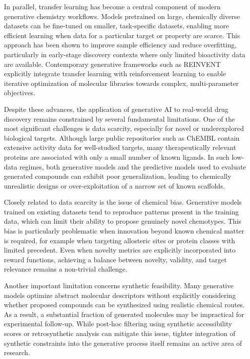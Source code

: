 \documentclass[letterpaper]{article}
\begin{document}
In parallel, transfer learning has become a central component of modern generative chemistry workflows\cite{Segler2017GeneratingNetworks,Gomez-Bombarelli2018AutomaticMolecules}. Models pretrained on large, chemically diverse datasets can be fine-tuned on smaller, task-specific datasets, enabling more efficient learning when data for a particular target or property are scarce. This approach has been shown to improve sample efficiency and reduce overfitting, particularly in early-stage discovery contexts where only limited bioactivity data are available. Contemporary generative frameworks such as REINVENT explicitly integrate transfer learning with reinforcement learning to enable iterative optimization of molecular libraries towards complex, multi-parameter objectives\cite{Blaschke2020ReinventDesign,Loeffler2024ReinventDesign}.

Despite these advances, the application of generative AI to real-world drug discovery remains constrained by several fundamental limitations. One of the most significant challenges is data scarcity, especially for novel or underexplored biological targets. Although large public repositories such as ChEMBL contain extensive activity data for well-studied targets, many therapeutically relevant proteins are associated with only a small number of known ligands. In such low-data regimes, both generative models and the predictive models used to evaluate generated compounds can exhibit poor generalization, leading to chemically unrealistic designs or over-exploitation of a narrow set of known scaffolds\cite{Walters2020AssessingChemistry,Tang2024AGeneration}.

Closely related to data scarcity is the issue of chemical bias. Generative models trained on existing datasets tend to reproduce patterns present in the training data, which can limit their ability to propose genuinely novel chemotypes. This bias is particularly problematic when innovation beyond known chemical matter is required, for example when targeting allosteric sites or protein classes with limited precedent. Even when novelty metrics are explicitly incorporated into reward functions, achieving a balance between novelty, validity, and target relevance remains a non-trivial challenge.

Another important limitation concerns synthetic feasibility. Many generative models optimize abstract molecular descriptors without explicitly considering whether proposed compounds can be synthesized using realistic chemical routes. As a result, a substantial fraction of generated molecules may be impractical for experimental follow-up. While post-hoc filtering using synthetic accessibility scores or retrosynthetic analysis can mitigate this issue, tighter integration of synthetic constraints into the generative process itself remains an active area of research\cite{Tang2024AGeneration}.
\end{document}
